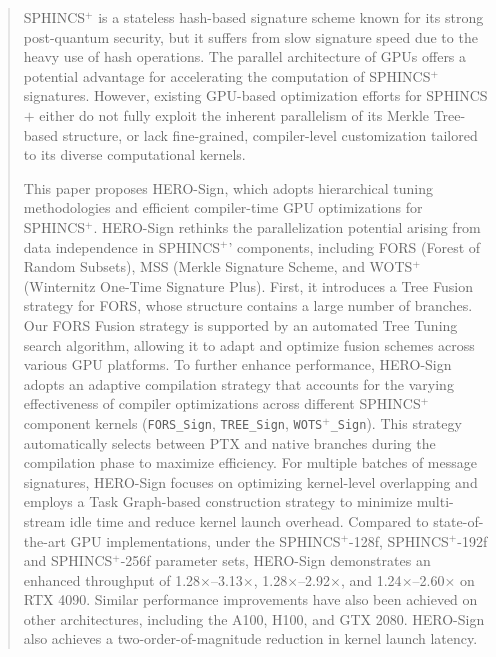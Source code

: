 \documentclass[10pt,conference]{IEEEtran}
\begin{document}
\begin{abstract}


SPHINCS$^+$ is a stateless hash-based signature scheme known for its strong post-quantum security, but it suffers from slow signature speed due to the heavy use of hash operations. The parallel architecture of GPUs offers a potential advantage for accelerating the computation of SPHINCS$^+$ signatures. However, existing GPU-based optimization efforts for SPHINCS$+$ either do not fully exploit the inherent parallelism of its Merkle Tree-based structure, or lack fine-grained, compiler-level customization tailored to its diverse computational kernels. 

This paper proposes HERO-Sign, which adopts hierarchical tuning methodologies and efficient compiler-time GPU optimizations for SPHINCS$^+$. HERO-Sign rethinks the parallelization potential arising from data independence in SPHINCS$^+$' components, including FORS (Forest of Random Subsets), MSS (Merkle Signature
Scheme, and WOTS$^+$ (Winternitz One-Time Signature Plus). First, it introduces a Tree Fusion strategy for FORS, whose structure contains a large number of branches. Our FORS Fusion strategy is supported by an automated Tree Tuning search algorithm, allowing it to adapt and optimize fusion schemes across various GPU platforms. To further enhance performance, HERO-Sign adopts an adaptive compilation strategy that accounts for the varying effectiveness of compiler optimizations across different SPHINCS$^+$ component kernels (\texttt{FORS\_Sign}, \texttt{TREE\_Sign}, \texttt{WOTS$^+$\_Sign}). This strategy automatically selects between PTX and native branches during the compilation phase to maximize efficiency. For multiple batches of message signatures, HERO-Sign focuses on optimizing kernel-level overlapping and employs a Task Graph-based construction strategy to minimize multi-stream idle time and reduce kernel launch overhead. Compared to state-of-the-art GPU implementations, under the SPHINCS$^+$-128f, SPHINCS$^+$-192f and SPHINCS$^+$-256f parameter sets, HERO-Sign demonstrates an enhanced throughput of 1.28$\times$–3.13$\times$, 1.28$\times$–2.92$\times$, and 1.24$\times$–2.60$\times$ on RTX 4090. Similar performance improvements have also been achieved on other architectures, including the A100, H100, and GTX 2080. HERO-Sign also achieves a two-order-of-magnitude reduction in kernel launch latency.





\end{abstract}
\end{document}
